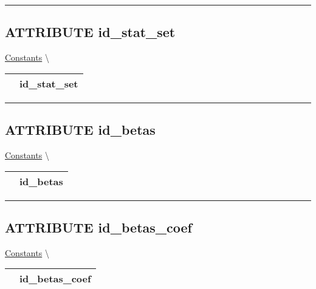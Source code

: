 \par


\rule{\linewidth}{0.5pt}
\subsection*{\textsf{\colorbox{headtoc}{\color{white} ATTRIBUTE}
id\_stat\_set}}

\hypertarget{ecldoc:constants.id_stat_set}{}
\hspace{0pt} \hyperlink{ecldoc:Constants}{Constants} \textbackslash 

{\renewcommand{\arraystretch}{1.5}
\begin{tabularx}{\textwidth}{|>{\raggedright\arraybackslash}l|X|}
\hline
\hspace{0pt}\mytexttt{\color{red} } & \textbf{id\_stat\_set} \\
\hline
\end{tabularx}
}

\par


\rule{\linewidth}{0.5pt}
\subsection*{\textsf{\colorbox{headtoc}{\color{white} ATTRIBUTE}
id\_betas}}

\hypertarget{ecldoc:constants.id_betas}{}
\hspace{0pt} \hyperlink{ecldoc:Constants}{Constants} \textbackslash 

{\renewcommand{\arraystretch}{1.5}
\begin{tabularx}{\textwidth}{|>{\raggedright\arraybackslash}l|X|}
\hline
\hspace{0pt}\mytexttt{\color{red} } & \textbf{id\_betas} \\
\hline
\end{tabularx}
}

\par


\rule{\linewidth}{0.5pt}
\subsection*{\textsf{\colorbox{headtoc}{\color{white} ATTRIBUTE}
id\_betas\_coef}}

\hypertarget{ecldoc:constants.id_betas_coef}{}
\hspace{0pt} \hyperlink{ecldoc:Constants}{Constants} \textbackslash 

{\renewcommand{\arraystretch}{1.5}
\begin{tabularx}{\textwidth}{|>{\raggedright\arraybackslash}l|X|}
\hline
\hspace{0pt}\mytexttt{\color{red} } & \textbf{id\_betas\_coef} \\
\hline
\end{tabularx}
}

